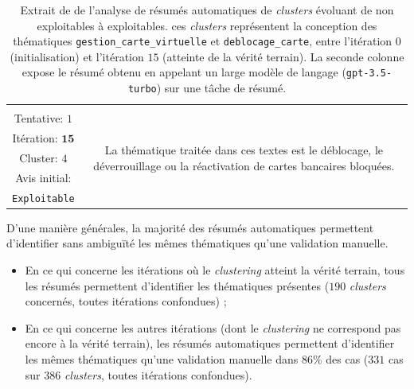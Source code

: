 \begin{table}[!htb]
\begin{center}
\begin{tabular}{|c|c|}
				{ \footnotesize \dotfill }
					& { \footnotesize \dotfill }
					\tabularnewline
					
				{ \footnotesize Tentative: $1$ }
					& \multirow{5}{*}{\parbox{12cm}{
						\footnotesize La thématique traitée dans ces textes est le déblocage, le déverrouillage ou la réactivation de cartes bancaires bloquées.
					}}
					\tabularnewline
				{ \footnotesize Itération: $\textbf{15}$ }
					&
					\tabularnewline
				{ \footnotesize Cluster: $4$ }
					&
					\tabularnewline
				{ \footnotesize Avis initial: }
					&
					\tabularnewline
				{ \footnotesize \color{colorDarkPastelGreen} \texttt{Exploitable} }
					&
					\tabularnewline
					\hline
					
				\end{tabular}
				\end{center}
				\caption{
					Extrait de de l'analyse de résumés automatiques de \textit{clusters} évoluant de non exploitables à exploitables.
					ces \textit{clusters} représentent la conception des thématiques \texttt{gestion\_carte\_virtuelle} et \texttt{deblocage\_carte}, entre l'itération $0$ (initialisation) et l'itération $15$ (atteinte de la vérité terrain).
					La seconde colonne expose le résumé obtenu en appelant un large modèle de langage (\texttt{gpt-3.5-turbo}) sur une tâche de résumé.
				}
				\label{table:4.4.3-ETUDE-PERTINENCE-RESUME-AUTOMATIQUE-DEBLOCAGE-CARTE-GESTION-CARTE-VIRTUELLE}
			\end{table}
			
			D'une manière générales, la majorité des résumés automatiques permettent d'identifier sans ambiguïté les mêmes thématiques qu'une validation manuelle.
			\begin{itemize}
				\item En ce qui concerne les itérations où le \textit{clustering} atteint la vérité terrain, tous les résumés permettent d'identifier les thématiques présentes ($190$ \textit{clusters} concernés, toutes itérations confondues) ;
				\item En ce qui concerne les autres itérations (dont le \textit{clustering} ne correspond pas encore à la vérité terrain), les résumés automatiques permettent d'identifier les mêmes thématiques qu'une validation manuelle dans $86$\% des cas ($331$ cas sur $386$ \textit{clusters}, toutes itérations confondues).
			\end{itemize}
			

